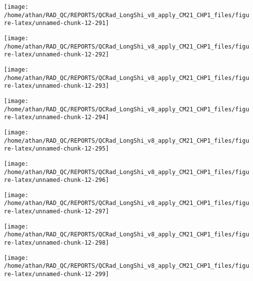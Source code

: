 \documentclass[
  10pt,
  a4paper,oneside]{article}
\begin{document}
\begin{center}\texttt{[image: /home/athan/RAD\_QC/REPORTS/QCRad\_LongShi\_v8\_apply\_CM21\_CHP1\_files/figure-latex/unnamed-chunk-12-291]} \end{center}

\begin{center}\texttt{[image: /home/athan/RAD\_QC/REPORTS/QCRad\_LongShi\_v8\_apply\_CM21\_CHP1\_files/figure-latex/unnamed-chunk-12-292]} \end{center}

\begin{center}\texttt{[image: /home/athan/RAD\_QC/REPORTS/QCRad\_LongShi\_v8\_apply\_CM21\_CHP1\_files/figure-latex/unnamed-chunk-12-293]} \end{center}

\begin{center}\texttt{[image: /home/athan/RAD\_QC/REPORTS/QCRad\_LongShi\_v8\_apply\_CM21\_CHP1\_files/figure-latex/unnamed-chunk-12-294]} \end{center}

\begin{center}\texttt{[image: /home/athan/RAD\_QC/REPORTS/QCRad\_LongShi\_v8\_apply\_CM21\_CHP1\_files/figure-latex/unnamed-chunk-12-295]} \end{center}

\begin{center}\texttt{[image: /home/athan/RAD\_QC/REPORTS/QCRad\_LongShi\_v8\_apply\_CM21\_CHP1\_files/figure-latex/unnamed-chunk-12-296]} \end{center}

\begin{center}\texttt{[image: /home/athan/RAD\_QC/REPORTS/QCRad\_LongShi\_v8\_apply\_CM21\_CHP1\_files/figure-latex/unnamed-chunk-12-297]} \end{center}

\begin{center}\texttt{[image: /home/athan/RAD\_QC/REPORTS/QCRad\_LongShi\_v8\_apply\_CM21\_CHP1\_files/figure-latex/unnamed-chunk-12-298]} \end{center}

\begin{center}\texttt{[image: /home/athan/RAD\_QC/REPORTS/QCRad\_LongShi\_v8\_apply\_CM21\_CHP1\_files/figure-latex/unnamed-chunk-12-299]} \end{center}
\end{document}
